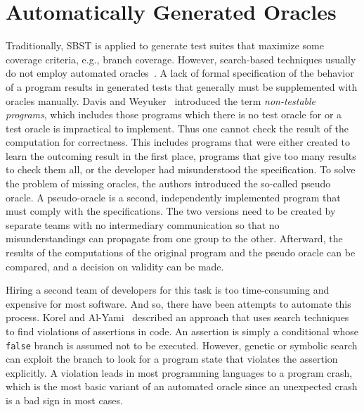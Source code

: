 \documentclass[paper=a4,%
  twoside,%
  BCOR4mm,%
  abstract=true,%
  toc=bibliography,%
  chapterprefix=true,%
  toc=bibliographynumbered,%
  open=right,%
  english,%
  pagesize=pdftex]{scrreprt}
\begin{document}
\section{Automatically Generated Oracles}
\label{sec:generated-oracles}
Traditionally, \ac{SBST} is applied to generate test suites that maximize some coverage criteria, e.g., branch coverage. However, search-based techniques usually do not employ automated oracles~\cite{Fraser2013}. A lack of formal specification of the behavior of a program results in generated tests that generally must be supplemented with oracles manually. Davis and Weyuker~\cite{10.1145/800175.809889} introduced the term \emph{non-testable programs}, which includes those programs which there is no test oracle for or a test oracle is impractical to implement. Thus one cannot check the result of the computation for correctness. This includes programs that were either created to learn the outcoming result in the first place, programs that give too many results to check them all, or the developer had misunderstood the specification. To solve the problem of missing oracles, the authors introduced the so-called pseudo oracle. A pseudo-oracle is a second, independently implemented program that must comply with the specifications. The two versions need to be created by separate teams with no intermediary communication so that no misunderstandings can propagate from one group to the other. Afterward, the results of the computations of the original program and the pseudo oracle can be compared, and a decision on validity can be made.

Hiring a second team of developers for this task is too time-consuming and expensive for most software. And so, there have been attempts to automate this process. Korel and Al-Yami~\cite{Korel1996} described an approach that uses search techniques to find violations of assertions in code. An assertion is simply a conditional whose \texttt{false} branch is assumed not to be executed. However, genetic or symbolic search can exploit the branch to look for a program state that violates the assertion explicitly. A violation leads in most programming languages to a program crash, which is the most basic variant of an automated oracle since an unexpected crash is a bad sign in most cases. 
\end{document}
